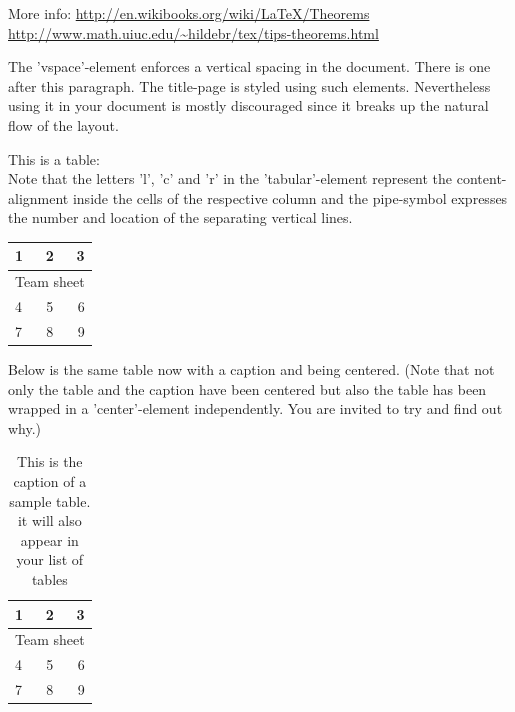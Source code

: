 \documentclass[a4paper, 12pt,oneside]{article}
\begin{document}
More info: \url{http://en.wikibooks.org/wiki/LaTeX/Theorems}
\url{http://www.math.uiuc.edu/~hildebr/tex/tips-theorems.html}\\

\vspace{5em}

The 'vspace'-element enforces a vertical spacing in the document. There is one after this paragraph. The title-page is styled using such elements. Nevertheless using it in your document is mostly discouraged since it breaks up the natural flow of the layout. 
\vspace{5em}

This is a table:\\Note that the letters 'l', 'c' and 'r' in the 'tabular'-element represent the content-alignment inside the cells of the respective column and the pipe-symbol expresses the number and location of the separating vertical lines. \\
\begin{tabular}{ l | c || r }
     \hline
     1 & 2 & 3 \\ \hline
     \multicolumn{3}{|c|}{Team sheet} \\ \hline
     4 & 5 & 6 \\ \hline \hline
     7 & 8 & 9 \\
     \hline
\end{tabular}

	
Below is the same table now with a caption and being centered. (Note that not only the table and the caption have been centered but also the table has been wrapped in a 'center'-element independently. You are invited to try and find out why.)\\
\begin{center}
\begin{table}[!h]
	\begin{center}
	\begin{tabular}{ l | c || r }
     \hline
     1 & 2 & 3 \\ \hline
     \multicolumn{3}{|c|}{Team sheet} \\ \hline
     4 & 5 & 6 \\ \hline \hline
     7 & 8 & 9 \\
     \hline
	\end{tabular}
	\end{center}
	\caption{This is the caption of a sample table. it will also appear in your list of tables}
\end{table}
\end{center}
\end{document}
